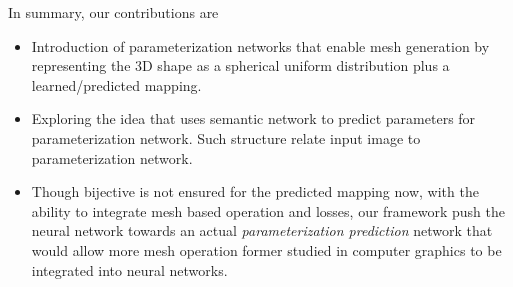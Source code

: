In summary, our contributions are
\begin{itemize}
	\item  Introduction of parameterization networks that enable mesh generation by representing the 3D shape as a spherical uniform distribution plus a learned/predicted mapping.
	\item  Exploring the idea that uses semantic network to predict parameters for parameterization network. Such structure relate input image to parameterization network.
	\item Though bijective is not ensured for the predicted mapping now, with the ability to integrate mesh based operation and losses, our framework push the neural network towards an actual \emph{parameterization prediction} network that would allow more mesh operation former studied in computer graphics to be integrated into neural networks.
\end{itemize}          


